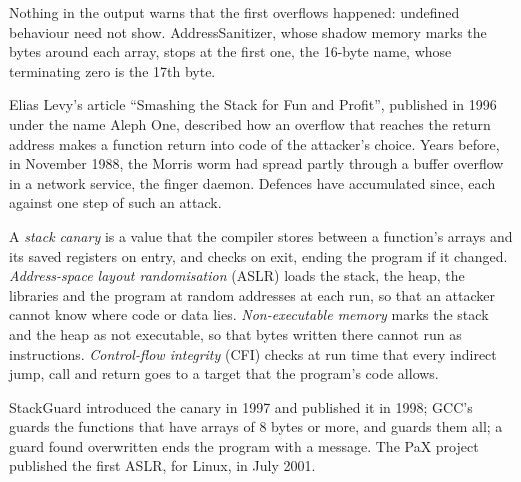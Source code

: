 \label{out:b3:software-security:login}

Nothing in the output warns that the first overflows happened: undefined behaviour need not show. AddressSanitizer, whose shadow memory marks the bytes around each array, stops at the first one, the 16-byte name, whose terminating zero is the 17th byte.

\label{out:b3:software-security:asan}

Elias Levy's article ``Smashing the Stack for Fun and Profit'', published in 1996 under the name Aleph One, described how an overflow that reaches the return address makes a function return into code of the attacker's choice. %
Years before, in November 1988, the Morris worm had spread partly through a buffer overflow in a network service, the finger daemon. %
Defences have accumulated since, each against one step of such an attack.

\begin{definition}\label{def:b3:software-security:defences}
A \emph{stack canary} is a value that the compiler stores between a function's arrays and its saved registers on entry, and checks on exit, ending the program if it changed. \emph{Address-space layout randomisation} (ASLR) loads the stack, the heap, the libraries and the program at random addresses at each run, so that an attacker cannot know where code or data lies. \emph{Non-executable memory} marks the stack and the heap as not executable, so that bytes written there cannot run as instructions. \emph{Control-flow integrity} (CFI) checks at run time that every indirect jump, call and return goes to a target that the program's code allows.
\end{definition}

StackGuard introduced the canary in 1997 and published it in 1998; GCC's  guards the functions that have arrays of 8 bytes or more, and  guards them all; a guard found overwritten ends the program with a message. %
The PaX project published the first ASLR, for Linux, in July 2001. %

